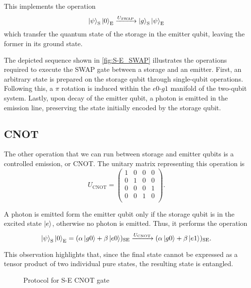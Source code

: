 This implements the operation
\begin{equation}
    \ket{\psi}_{\text{S}} \ket{0}_{\text{E}} \xrightarrow{U_{\text{SWAP}}}
    \ket{g}_{\text{S}} \ket{\psi}_{\text{E}}
\end{equation}
which transfer the quantum state of the storage in the emitter qubit, leaving the former in its ground state.

The depicted sequence shown in \cref{fig:S-E_SWAP} illustrates the operations required to execute the SWAP gate between a storage and an emitter.
First, an arbitrary state is prepared on the storage qubit through single-qubit operations.
Following this, a $\pi$ rotation is induced within the $e0$-$g1$ manifold of the two-qubit system.
Lastly, upon decay of the emitter qubit, a photon is emitted in the emission line, preserving the state initially encoded by the storage qubit.

\subsection{CNOT}

The other operation that we can run between storage and emitter qubits is a controlled emission, or CNOT.
The unitary matrix representing this operation is
\begin{equation}
    U_{\text{CNOT}} = 
    \begin{pmatrix}
    1 & 0 & 0 & 0 \\
    0 & 1 & 0 & 0 \\
    0 & 0 & 0 & 1 \\
    0 & 0 & 1 & 0 \\
\end{pmatrix}.
\end{equation}

A photon is emitted form the emitter qubit only if the storage qubit is in the excited state $\ket{e}$, otherwise no photon is emitted.
Thus, it performs the operation
\begin{equation}
    \ket{\psi}_{\text{S}} \ket{0}_{\text{E}} = 
    (\alpha \ket{g0} + \beta \ket{e0})_{\text{SE}} \xrightarrow{U_{\text{CNOT}}}
    (\alpha \ket{g0} + \beta \ket{e1})_{\text{SE}} .
\end{equation}

This observation highlights that, since the final state cannot be expressed as a tensor product of two individual pure states, the resulting state is entangled.

\begin{figure}
    \centering
    
    \vspace{-1cm}
    \caption{Protocol for S-E CNOT gate}
    \label{fig:SE_CNOT}
\end{figure}

